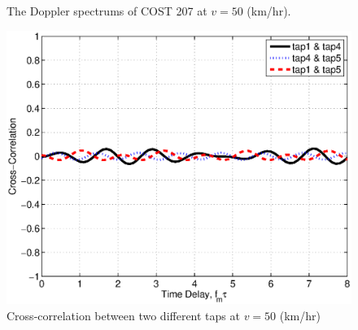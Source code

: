 \documentclass[12pt, draftclsnofoot, onecolumn]{IEEEtran}
\begin{document}
\begin{figure}[t]
\centering
{}
\caption{The Doppler spectrums of COST 207 at $v=50$ (km/hr).}\label{fig:dopplerspectrum}
\end{figure}




\begin{figure}[t]
\centering
\includegraphics[width=.6\linewidth]{crosscorr_v50.eps}
\caption{Cross-correlation between two different taps at $v = 50$ (km/hr)}\label{fig:crosscorr}
\end{figure}
\end{document}

